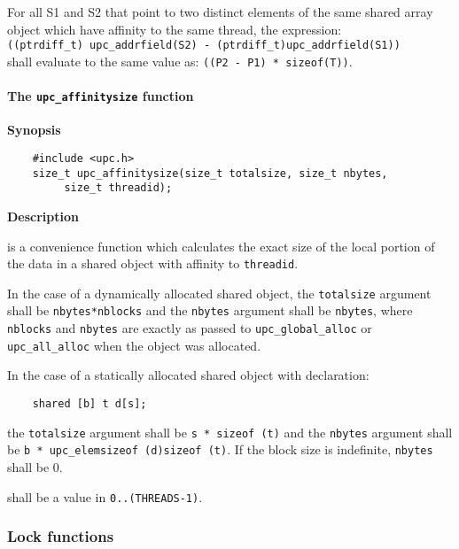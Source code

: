   For all S1 and S2 that point to two distinct elements of
   the same shared array object which have affinity to the same
   thread, the expression:\\
    {\tt ((ptrdiff\_t) upc\_addrfield(S2) - (ptrdiff\_t)upc\_addrfield(S1))} \\
   shall evaluate to the same value as: {\tt ((P2 - P1) * sizeof(T))}.


\paragraph{The {\tt upc\_affinitysize} function}

{\bf Synopsis} 

\npf\vspace{-2.5em}
\begin{verbatim}
    #include <upc.h> 
    size_t upc_affinitysize(size_t totalsize, size_t nbytes, 
         size_t threadid);
\end{verbatim}

{\bf Description}

 is a convenience function which 
    calculates the exact size of the local portion of the data in a 
    shared object with affinity to {\tt threadid}.
    
\np In the case of a dynamically allocated shared object,
    the {\tt totalsize} argument shall be {\tt nbytes*nblocks} and the {\tt nbytes}
    argument shall be {\tt nbytes}, where {\tt nblocks} and {\tt nbytes} are exactly as
    passed to {\tt upc\_global\_alloc} or {\tt upc\_all\_alloc} when the 
    object was allocated.

\np In the case of a statically allocated shared object
    with declaration:

\begin{verbatim}
    shared [b] t d[s];
\end{verbatim}   

    the {\tt totalsize} argument shall be {\tt s * sizeof (t)} and the
    {\tt nbytes} argument shall be {\tt b * 
    {upc\_elemsizeof (d)}{sizeof (t)}}.  If the block size is indefinite,
    {\tt nbytes} shall be 0.
        
 shall be a value in {\tt 0..(THREADS-1)}.

\subsubsection{Lock functions}
\label{upc_lock}

